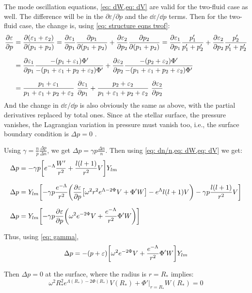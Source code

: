\documentclass[a4paper,12pt,onehalfspacing]{report}
\begin{document}
The mode oscillation equations, \cref{eq: dW,eq: dV} are valid for the two-fluid case as well. The difference will be in the $\partial \varepsilon/ \partial p$ and the $\dd\varepsilon/ \dd p$ terms. Then for the two-fluid case, the change is, using \cref{eq: structure eqns twof}: 
\begin{align*}
    \pdv{\varepsilon}{p}&= \pdv{\qty(\varepsilon_1+\varepsilon_2)}{\qty(p_1+p_2)}= \pdv{\varepsilon_1}{p_1}\pdv{p_1}{\qty(p_1+p_2)}+ \pdv{\varepsilon_2}{p_2}\pdv{p_2}{\qty(p_1+p_2)}= \pdv{\varepsilon_1}{p_1}\frac{p_1'}{p_1'+p_2'}+ \pdv{\varepsilon_2}{p_2}\frac{p_2'}{p_1'+p_2'}\\[1.5ex]
    &= \pdv{\varepsilon_1}{p_1}\frac{-(p_1+\varepsilon_1)\Phi'}{-(p_1+\varepsilon_1+p_2+\varepsilon_2)\Phi'}+ \pdv{\varepsilon_2}{p_2}\frac{-(p_2+\varepsilon_2)\Phi'}{-(p_1+\varepsilon_1+p_2+\varepsilon_2)\Phi'}\\[1.5ex]
    &= \frac{p_1+\varepsilon_1}{p_1+\varepsilon_1+p_2+\varepsilon_2} \ \pdv{\varepsilon_1}{p_1}+ \frac{p_2+\varepsilon_2}{p_1+\varepsilon_1+p_2+\varepsilon_2}\ \pdv{\varepsilon_2}{p_2}
\end{align*}
And the change in $\dd\varepsilon/ \dd p$ is also obviously the same as above, with the partial derivatives replaced by total ones. Since at the stellar surface, the pressure vanishes, the Lagrangian variation in pressure must vanish too, i.e., the surface boundary condition is $\Delta p= 0$ \cite{Sotani}. 

Using $\gamma= \frac{n}{p}\frac{\Delta p}{\Delta n}$, we get $\Delta p= \gamma p \frac{\Delta n}{n}$. Then using \cref{eq: dn/n,eq: dW,eq: dV} we get:
\begin{align*}
    \Delta p &= -\gamma p \qty[e^{-\Lambda}\frac{W'}{r^2}+\frac{l(l+1)}{r^2}V]Y_{lm}\\[1.5ex]
    \Delta p &=  Y_{lm}\qty[-\gamma p\frac{e^{-\Lambda}}{r^2}\qty(\pdv{\varepsilon}{p}\qty[\omega^2 r^2e^{\Lambda-2\Phi} V+\Phi'W]- e^\Lambda l(l+1)V)-\gamma p \frac{l(l+1)}{r^2}V]\\[1.5ex]
    \Delta p &=  Y_{lm}\qty[-\gamma p\pdv{\varepsilon}{p}\qty(\omega^2 e^{-2\Phi} V+\frac{e^{-\Lambda}}{r^2}\Phi'W)]
\end{align*}

Thus, using \cref{eq: gamma},
\begin{equation}
    \Delta p =  -\qty(p+\varepsilon)\qty[\omega^2 e^{-2\Phi} V+\frac{e^{-\Lambda}}{r^2}\Phi'W]Y_{lm}\label{eq: surf dp}
\end{equation} 

Then $\Delta p= 0$ at the surface, where the radius is $r= R_*$ implies: 
\begin{equation}
    \omega^2 R_*^2e^{\Lambda(R_*)-2\Phi(R_*)} V(R_*)+\Phi'|_{r=R_*} W(R_*)= 0 \label{eq: surf cond}
\end{equation}
\end{document}
